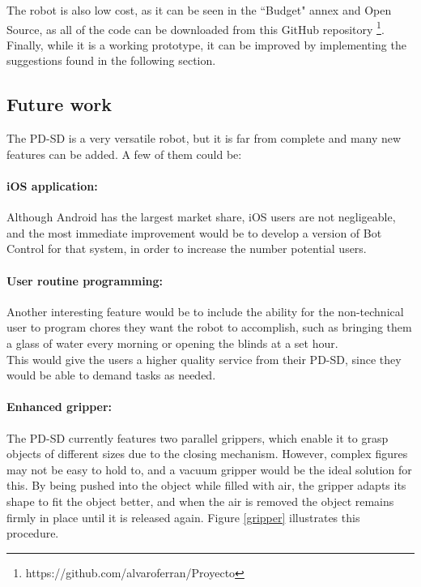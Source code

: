 The robot is also low cost, as it can be seen in the ``Budget" annex and Open Source, as all of the code can be downloaded from this GitHub repository \footnote{https://github.com/alvaroferran/Proyecto}.\\

Finally, while it is a working prototype, it can be improved by implementing the suggestions found in the following section.





















\newpage
\subsection{Future work}

The PD-SD is a very versatile robot, but it is far from complete and many new features can be added. A few of them could be:

\paragraph{iOS application:} Although Android has the largest market share, iOS users are not negligeable, and the most immediate improvement would be to develop a version of Bot Control for that system, in order to increase the number potential users.

\paragraph{User routine programming:} Another interesting feature would be to include the ability for the non-technical user to program chores they want the robot to accomplish, such as bringing them a glass of water every morning or opening the blinds at a set hour. \\

This would give the users a higher quality service from their PD-SD, since they would be able to demand tasks as needed.



\paragraph{Enhanced gripper:}  The PD-SD currently features two parallel grippers, which enable it to grasp objects of different sizes due to the closing mechanism. However, complex figures may not be easy to hold to, and a vacuum gripper would be the ideal solution for this. By being pushed into the object while filled with air, the gripper adapts its shape to fit the object better, and when the air is removed the object remains firmly in place until it is released again. Figure \ref{gripper} illustrates this procedure.


